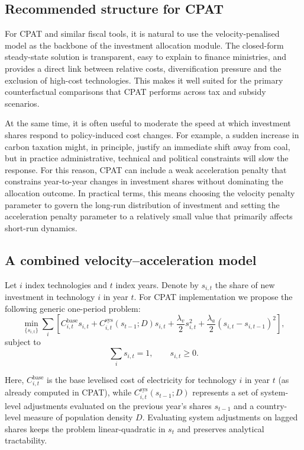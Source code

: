 \documentclass[preprint,authoryear,12pt]{elsarticle}
\begin{document}
\subsection{Recommended structure for CPAT}

For CPAT and similar fiscal tools, it is natural to use the velocity-penalised model as the
backbone of the investment allocation module. The closed-form steady-state solution is
transparent, easy to explain to finance ministries, and provides a direct link between relative
costs, diversification pressure and the exclusion of high-cost technologies. This makes it well
suited for the primary counterfactual comparisons that CPAT performs across tax and subsidy
scenarios.

At the same time, it is often useful to moderate the speed at which investment shares respond to
policy-induced cost changes. For example, a sudden increase in carbon taxation might, in
principle, justify an immediate shift away from coal, but in practice administrative, technical and
political constraints will slow the response. For this reason, CPAT can include a weak
acceleration penalty that constrains year-to-year changes in investment shares without
dominating the allocation outcome. In practical terms, this means choosing the velocity penalty
parameter to govern the long-run distribution of investment and setting the acceleration penalty
parameter to a relatively small value that primarily affects short-run dynamics.


\subsection{A combined velocity–acceleration model}

Let $i$ index technologies and $t$ index years. Denote by $s_{i,t}$ the share of new investment in
technology $i$ in year $t$. For CPAT implementation we propose the following generic
one-period problem:
\begin{equation}
    \min_{\{s_{i,t}\}}
    \sum_i \left[
        C_{i,t}^{\text{base}} s_{i,t}
      + C_{i,t}^{\text{sys}}(s_{t-1};D) s_{i,t}
      + \frac{\lambda_v}{2} s_{i,t}^2
      + \frac{\lambda_a}{2}(s_{i,t} - s_{i,t-1})^2
    \right],
    \label{eq:combined_objective}
\end{equation}
subject to
\begin{equation}
    \sum_i s_{i,t} = 1, \qquad s_{i,t} \ge 0.
\end{equation}

Here, $C_{i,t}^{\text{base}}$ is the base levelised cost of electricity for technology $i$ in year $t$
(as already computed in CPAT), while $C_{i,t}^{\text{sys}}(s_{t-1};D)$ represents a set of
system-level adjustments evaluated on the previous year's shares $s_{t-1}$ and a country-level
measure of population density $D$. Evaluating system adjustments on lagged shares keeps the
problem linear-quadratic in $s_{t}$ and preserves analytical tractability.
\end{document}

